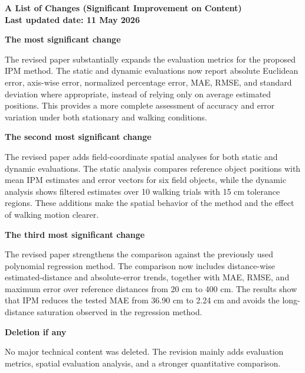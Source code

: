 \documentclass[14pt]{extarticle}
\begin{document}
\begin{center}
\textbf{A List of Changes (Significant Improvement on Content)}\\
\textbf{Last updated date: 11 May 2026}
\end{center}

\vspace{0.5em}

\noindent
\textbf{The most significant change}

The revised paper substantially expands the evaluation metrics for the proposed
IPM method. The static and dynamic evaluations now report absolute Euclidean
error, axis-wise error, normalized percentage error, MAE, RMSE, and standard
deviation where appropriate, instead of relying only on average estimated
positions. This provides a more complete assessment of accuracy and error
variation under both stationary and walking conditions.

\vspace{0.8em}

\noindent
\textbf{The second most significant change}

The revised paper adds field-coordinate spatial analyses for both static and
dynamic evaluations. The static analysis compares reference object positions
with mean IPM estimates and error vectors for six field objects, while the
dynamic analysis shows filtered estimates over 10 walking trials with 15 cm
tolerance regions. These additions make the spatial behavior of the method and
the effect of walking motion clearer.

\vspace{0.8em}

\noindent
\textbf{The third most significant change}

The revised paper strengthens the comparison against the previously used
polynomial regression method. The comparison now includes distance-wise
estimated-distance and absolute-error trends, together with MAE, RMSE, and
maximum error over reference distances from 20 cm to 400 cm. The results show
that IPM reduces the tested MAE from 36.90 cm to 2.24 cm and avoids the
long-distance saturation observed in the regression method.

\vspace{1.2em}

\noindent
\textbf{Deletion if any}

No major technical content was deleted. The revision mainly adds evaluation
metrics, spatial evaluation analysis, and a stronger quantitative comparison.
\end{document}
